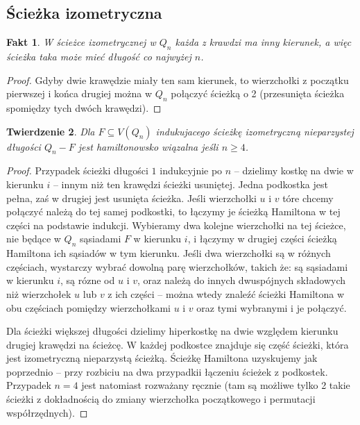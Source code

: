 \documentclass{pracamgr}
\newtheorem{theorem}{Twierdzenie}
\newtheorem{fact}[theorem]{Fakt}
\begin{document}
   \subsection{Ścieżka izometryczna}
    \begin{fact}\label{sciezka izo - rozne kierunki}
     W ścieżce izometrycznej w $Q_n$ każda z krawdzi ma inny kierunek, a więc ścieżka taka może mieć długość co najwyżej $n$.
    \end{fact}
    \begin{proof}
     Gdyby dwie krawędzie miały ten sam kierunek, to wierzchołki z początku pierwszej i końca drugiej można w $Q_n$ połączyć ścieżką o 2
     (przesunięta ścieżka spomiędzy tych dwóch krawędzi).
    \end{proof}
    \begin{theorem}\label{hamilton - sciezka, nieparz} %
     Dla $F\subseteq V(Q_n)$ indukujacego ścieżkę izometryczną nieparzystej długości $Q_n-F$ jest hamiltonowsko wiązalna jeśli $n\ge4$.
    \end{theorem}
    \begin{proof}
     Przypadek ścieżki długości $1$ indukcyjnie po $n$ -- dzielimy kostkę na dwie w kierunku $i$ -- innym niż ten krawędzi ścieżki usuniętej.
     Jedna podkostka jest pełna, zaś w drugiej jest usunięta ścieżka. Jeśli wierzchołki $u$ i $v$ tóre chcemy połączyć należą do tej samej
     podkostki, to łączymy je ścieżką Hamiltona w tej części na podstawie indukcji. Wybieramy dwa kolejne wierzchołki na tej ścieżce,
     nie będące w $Q_n$ sąsiadami $F$ w kierunku $i$, i łączymy w drugiej części ścieżką Hamiltona ich sąsiadów w tym kierunku.\newline
     Jeśli dwa wierzchołki są w różnych częściach, wystarczy wybrać dowolną parę wierzchołków, takich że: są sąsiadami w kierunku $i$, są rózne od
     $u$ i $v$, oraz należą do innych dwuspójnych składowych niż wierzchołek $u$ lub $v$ z ich części
     -- można wtedy znaleźć ścieżki Hamiltona w obu częściach pomiędzy wierzchołkami $u$ i $v$ oraz tymi wybranymi i je połączyć.\newline
     
     Dla ścieżki większej długości dzielimy hiperkostkę na dwie względem kierunku drugiej krawędzi na ścieżcę. W każdej podkostce znajduje się część ścieżki,
     która jest izometryczną nieparzystą ścieżką. Ścieżkę Hamiltona uzyskujemy jak poprzednio -- przy rozbiciu na dwa przypadkii łączeniu ścieżek z podkostek.
     Przypadek $n=4$ jest natomiast rozważany ręcznie
     (tam są możliwe tylko 2 takie ścieżki z dokładnością do zmiany wierzchołka początkowego i permutacji współrzędnych).
    \end{proof}
\end{document}
